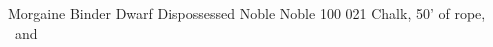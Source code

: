 
\begin{filledCS}%
  {Morgaine Binder}%
  {Dwarf}%
  {Dispossessed Noble}%
  {Noble}%
  {{1}{0}{0}}%
  {{0}{2}{1}}%
  {%
    \shortsword
    \partialleather
    \setcounter{Academics}{1}
    \setcounter{Caving}{1}
    \setcounter{Empathy}{2}
    \setcounter{Vigilance}{2}
    \setcounter{Fate}{1}
  }%
  {}%
  {Chalk, 50' of rope, \rations\ and \rations}%

  \renewcommand\rank{Fodder}
  \renewcommand\characterDebt{100 \glspl{sp}}
  \renewcommand\charSpells{
    \showSpells{Fate1}
    \showSpells{Fate1}
  }

\end{filledCS}

